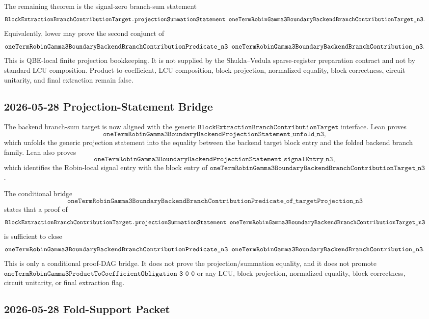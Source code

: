 The remaining theorem is the signal-zero branch-sum statement
\[
  \texttt{BlockExtractionBranchContributionTarget.projectionSummationStatement\
  oneTermRobinGamma3BoundaryBackendBranchContributionTarget\_n3}.
\]
Equivalently, lower may prove the second conjunct of
\[
  \texttt{oneTermRobinGamma3BoundaryBackendBranchContributionPredicate\_n3\
  oneTermRobinGamma3BoundaryBackendBranchContribution\_n3}.
\]
This is QBE-local finite projection bookkeeping.  It is not supplied by the
Shukla--Vedula sparse-register preparation contract and not by standard LCU
composition.  Product-to-coefficient, LCU composition, block projection,
normalized equality, block correctness, circuit unitarity, and final
extraction remain false.

\subsection{2026-05-28 Projection-Statement Bridge}

The backend branch-sum target is now aligned with the generic
\(\texttt{BlockExtractionBranchContributionTarget}\) interface.  Lean proves
\[
  \texttt{oneTermRobinGamma3BoundaryBackendProjectionStatement\_unfold\_n3},
\]
which unfolds the generic projection statement into the equality between the
backend target block entry and the folded backend branch family.  Lean also
proves
\[
  \texttt{oneTermRobinGamma3BoundaryBackendProjectionStatement\_signalEntry\_n3},
\]
which identifies the Robin-local signal entry with the block entry of
\(\texttt{oneTermRobinGamma3BoundaryBackendBranchContributionTarget\_n3}\).

The conditional bridge
\[
  \texttt{oneTermRobinGamma3BoundaryBackendBranchContributionPredicate\_of\_targetProjection\_n3}
\]
states that a proof of
\[
  \texttt{BlockExtractionBranchContributionTarget.projectionSummationStatement\
  oneTermRobinGamma3BoundaryBackendBranchContributionTarget\_n3}
\]
is sufficient to close
\[
  \texttt{oneTermRobinGamma3BoundaryBackendBranchContributionPredicate\_n3\
  oneTermRobinGamma3BoundaryBackendBranchContribution\_n3}.
\]
This is only a conditional proof-DAG bridge.  It does not prove the
projection/summation equality, and it does not promote
\(\texttt{oneTermRobinGamma3ProductToCoefficientObligation\ 3\ 0\ 0}\) or any
LCU, block projection, normalized equality, block correctness, circuit
unitarity, or final extraction flag.

\subsection{2026-05-28 Fold-Support Packet}

